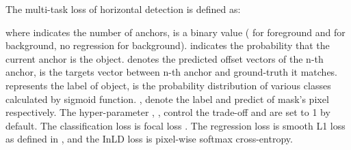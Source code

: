 \documentclass[10pt,journal,compsoc]{IEEEtran}
\begin{document}
The multi-task loss of horizontal detection is defined as:

where  indicates the number of anchors,  is a binary value ( for foreground and  for background, no regression for background).  indicates the probability that the current anchor is the object.  denotes the predicted offset vectors of the n-th anchor,  is the targets vector between n-th anchor and ground-truth it matches.  represents the label of object,  is the probability distribution of various classes calculated by sigmoid function. ,  denote the label and predict of mask's pixel respectively. The hyper-parameter , ,  control the trade-off and are set to 1 by default. The classification loss  is focal loss \cite{lin2017focal}. The regression loss  is smooth L1 loss as defined in \cite{girshick2015fast}, and the InLD loss  is pixel-wise softmax cross-entropy.
\end{document}
